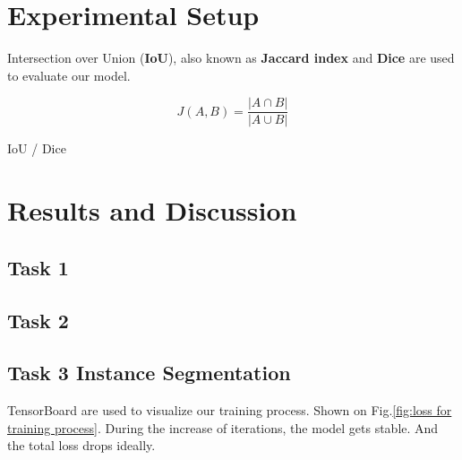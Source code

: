 \documentclass[conference]{IEEEtran}
\begin{document}
\section{Experimental Setup}

Intersection over Union (\textbf{IoU}), also known as \textbf{Jaccard index} and \textbf{Dice} are used to evaluate our model.

\begin{equation}
    J(A,B)=\frac{|A\cap B|}{|A\cup B|}
\end{equation}

IoU / Dice



\section{Results and Discussion}

\subsection{Task 1}

\subsection{Task 2}

\subsection{Task 3 Instance Segmentation}

TensorBoard are used to visualize our training process.
Shown on Fig.\ref{fig:loss for training process}.
During the increase of iterations, the model gets stable.
And the total loss drops ideally.
\end{document}
